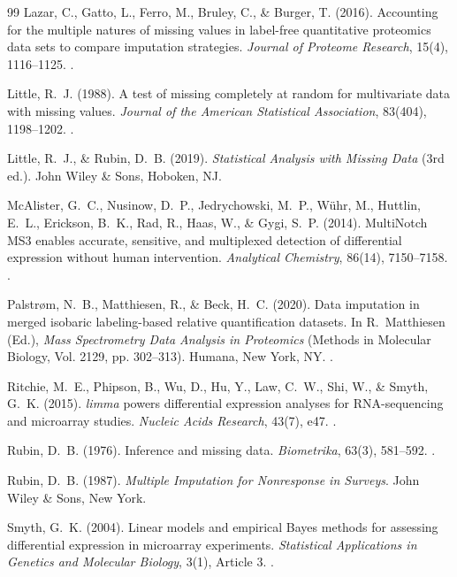 \documentclass[11pt,oneside]{book}
\begin{document}
\begin{thebibliography}{99}
Lazar, C., Gatto, L., Ferro, M., Bruley, C., \& Burger, T. (2016). Accounting for the multiple natures of missing values in label-free quantitative proteomics data sets to compare imputation strategies. \textit{Journal of Proteome Research}, 15(4), 1116--1125. .

Little, R.~J. (1988). A test of missing completely at random for multivariate data with missing values. \textit{Journal of the American Statistical Association}, 83(404), 1198--1202. .

Little, R.~J., \& Rubin, D.~B. (2019). \textit{Statistical Analysis with Missing Data} (3rd ed.). John Wiley \& Sons, Hoboken, NJ.

McAlister, G.~C., Nusinow, D.~P., Jedrychowski, M.~P., W{\"u}hr, M., Huttlin, E.~L., Erickson, B.~K., Rad, R., Haas, W., \& Gygi, S.~P. (2014). MultiNotch MS3 enables accurate, sensitive, and multiplexed detection of differential expression without human intervention. \textit{Analytical Chemistry}, 86(14), 7150--7158. .

Palstr{\o}m, N.~B., Matthiesen, R., \& Beck, H.~C. (2020). Data imputation in merged isobaric labeling-based relative quantification datasets. In R.~Matthiesen (Ed.), \textit{Mass Spectrometry Data Analysis in Proteomics} (Methods in Molecular Biology, Vol. 2129, pp. 302--313). Humana, New York, NY. .

Ritchie, M.~E., Phipson, B., Wu, D., Hu, Y., Law, C.~W., Shi, W., \& Smyth, G.~K. (2015). \textit{limma} powers differential expression analyses for RNA-sequencing and microarray studies. \textit{Nucleic Acids Research}, 43(7), e47. .

Rubin, D.~B. (1976). Inference and missing data. \textit{Biometrika}, 63(3), 581--592. .

Rubin, D.~B. (1987). \textit{Multiple Imputation for Nonresponse in Surveys}. John Wiley \& Sons, New York.

Smyth, G.~K. (2004). Linear models and empirical Bayes methods for assessing differential expression in microarray experiments. \textit{Statistical Applications in Genetics and Molecular Biology}, 3(1), Article 3. .


\end{thebibliography}
\end{document}
